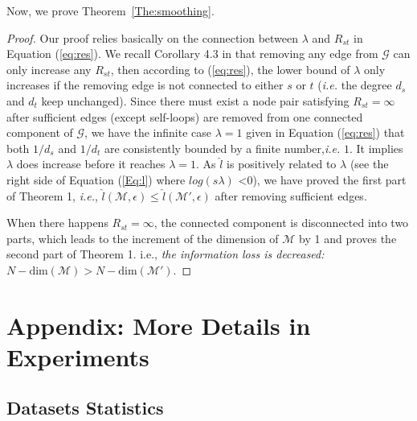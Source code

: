 \documentclass{article}
\def\gG{{\mathcal{G}}}
\def\gM{{\mathcal{M}}}
\begin{document}
Now, we prove Theorem~\ref{The:smoothing}.
\begin{proof}
Our proof relies basically on the connection between $\lambda$ and $R_{st}$ in Equation (\ref{eq:res}).
We recall Corollary 4.3 in \cite{Lovasz1993} that removing any edge from $\gG$ can only increase any $R_{st}$, then according to (\ref{eq:res}), the lower bound of $\lambda$  only increases if the removing edge is not connected to either $s$ or $t$ (\emph{i.e.} the degree $d_s$ and $d_t$ keep unchanged). 
Since there must exist a node pair satisfying $R_{st}=\infty$ after sufficient edges (except self-loops) are removed from one connected component of $\gG$, we have the infinite case $\lambda =1$ given in Equation (\ref{eq:res}) that both $1/d_s$ and $1/d_t$ are consistently bounded by a finite number,\emph{i.e.} $1$. It implies $\lambda$ does increase before it reaches $\lambda=1$.  As $\hat{l}$ is positively related to $\lambda$ (see the right side of Equation (\ref{Eq:l}) where $log(s\lambda)$ <0), we have proved the first part of Theorem 1, \emph{i.e.}, {\em $\hat{l}(\gM, \epsilon)\leq \hat{l}(\gM', \epsilon)$} after removing sufficient edges.

When there happens $R_{st}=\infty$, the connected component is disconnected into two parts, which leads to the increment of the dimension of $\mathcal{M}$ by 1 and proves the second part of Theorem 1. i.e.,
{\em the information loss is decreased: $N-\text{dim}(\gM) > N-\text{dim}(\gM')$}. 

\end{proof}


\newpage
\section{Appendix: More Details in Experiments}
\subsection{Datasets Statistics}
\end{document}

